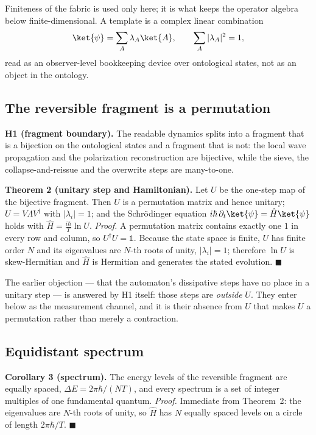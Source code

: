 Finiteness of the fabric is used only here; it is what keeps the operator algebra
below finite-dimensional.  A template is a complex linear combination
\begin{equation}
\ket{\psi}=\sum_{A}\lambda_{A}\ket{A},
\qquad \sum_{A}|\lambda_{A}|^{2}=1 ,
\end{equation}
read as an observer-level bookkeeping device over ontological states, not as an
object in the ontology.

\subsection{The reversible fragment is a permutation}\label{bridge:permutation}
\textbf{H1 (fragment boundary).}  The readable dynamics splits into a fragment
that is a bijection on the ontological states and a fragment that is not: the
local wave propagation and the polarization reconstruction are bijective, while
the sieve, the collapse-and-reissue and the overwrite steps are many-to-one.

\textbf{Theorem 2 (unitary step and Hamiltonian).}  Let $U$ be the one-step map of
the bijective fragment.  Then $U$ is a permutation matrix and hence unitary;
$U=V\Lambda V^{\dagger}$ with $|\lambda_{i}|=1$; and the Schr\"odinger equation
$i\hbar\,\partial_{t}\ket{\psi}=\hat{H}\ket{\psi}$ holds with
$\hat{H}=\tfrac{i\hbar}{T}\ln U$.
\emph{Proof.}  A permutation matrix contains exactly one $1$ in every row and
column, so $U^{\dagger}U=\mathbb{1}$.  Because the state space is finite, $U$ has
finite order $N$ and its eigenvalues are $N$-th roots of unity, $|\lambda_{i}|=1$;
therefore $\ln U$ is skew-Hermitian and $\hat{H}$ is Hermitian and generates the
stated evolution. \hfill$\blacksquare$

The earlier objection --- that the automaton's dissipative steps have no place in
a unitary step --- is answered by H1 itself: those steps are \emph{outside} $U$.
They enter below as the measurement channel, and it is their absence from $U$ that
makes $U$ a permutation rather than merely a contraction.

\subsection{Equidistant spectrum}\label{bridge:spectrum}
\textbf{Corollary 3 (spectrum).}  The energy levels of the reversible fragment are
equally spaced, $\Delta E=2\pi\hbar/(NT)$, and every spectrum is a set of integer
multiples of one fundamental quantum.
\emph{Proof.}  Immediate from Theorem~2: the eigenvalues are $N$-th roots of
unity, so $\hat{H}$ has $N$ equally spaced levels on a circle of length
$2\pi\hbar/T$. \hfill$\blacksquare$

